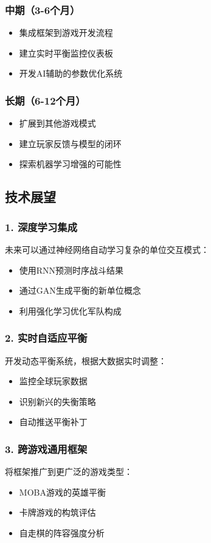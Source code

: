 \documentclass[a4paper,12pt]{article}
\begin{document}
\subsubsection{中期（3-6个月）}
\begin{itemize}
\item 集成框架到游戏开发流程
\item 建立实时平衡监控仪表板
\item 开发AI辅助的参数优化系统
\end{itemize}

\subsubsection{长期（6-12个月）}
\begin{itemize}
\item 扩展到其他游戏模式
\item 建立玩家反馈与模型的闭环
\item 探索机器学习增强的可能性
\end{itemize}

\subsection{技术展望}

\subsubsection{1. 深度学习集成}
未来可以通过神经网络自动学习复杂的单位交互模式：
\begin{itemize}
\item 使用RNN预测时序战斗结果
\item 通过GAN生成平衡的新单位概念
\item 利用强化学习优化军队构成
\end{itemize}

\subsubsection{2. 实时自适应平衡}
开发动态平衡系统，根据大数据实时调整：
\begin{itemize}
\item 监控全球玩家数据
\item 识别新兴的失衡策略
\item 自动推送平衡补丁
\end{itemize}

\subsubsection{3. 跨游戏通用框架}
将框架推广到更广泛的游戏类型：
\begin{itemize}
\item MOBA游戏的英雄平衡
\item 卡牌游戏的构筑评估
\item 自走棋的阵容强度分析
\end{itemize}
\end{document}
